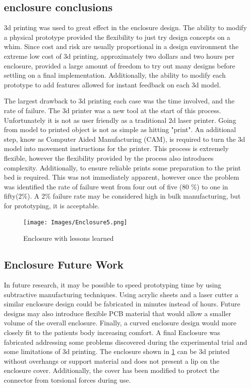 \subsection{enclosure conclusions}
3d printing was used to great effect in the enclosure design. The ability to modify a physical prototype provided the flexibility to just try design concepts on a whim. Since cost and risk are usually proportional in a design environment the extreme low cost of 3d printing, approximately two dollars and two hours per enclosure, provided a large amount of freedom to try out many designs before settling on a final implementation. Additionally, the ability to modify each prototype to add features allowed for instant feedback on each 3d model. 

The largest drawback to 3d printing each case was the time involved, and the rate of failure. The 3d printer was a new tool at the start of this process. Unfortunately it is not as user friendly as a traditional 2d laser printer. Going from model to printed object is not as simple as hitting "print". An additional step, know as Computer Aided Manufacturing (CAM), is required to turn the 3d model into movement instructions for the printer. This process is extremely flexible, however the flexibility provided by the process also introduces complexity. Additionally, to ensure reliable prints some preparation to the print bed is required. This was not immediately apparent, however once the problem was identified the rate of failure went from four out of five (80 \%) to one in fifty(2\%). A 2\% failure rate may be considered high in bulk manufacturing, but for prototyping, it is acceptable.


\begin{figure}[ht]
 \begin{center}
  \label{fig:enclosure5}
  \texttt{[image: Images/Enclosure5.png]} 
  \caption{Enclosure with lessons learned} 
 \end{center}
\end{figure}

\subsection{Enclosure Future Work}
In future research, it may be possible to speed prototyping time by using subtractive manufacturing techniques. Using acrylic sheets and a laser cutter a similar enclosure design could be fabricated in minutes instead of hours. Future designs may also introduce flexible PCB material that would allow a smaller volume of the overall enclosure. Finally, a curved enclosure design would more closely fit to the patients body increasing comfort. A final Enclosure was fabricated addressing some problems discovered during the experimental trial and some limitations of 3d printing. The enclosure shown in \cref{fig:enclosure5} can be 3d printed without overhangs or support material and does not present a lip on the enclosure cover. Additionally, the cover has been modified to protect the  connector from torsional forces during use.







